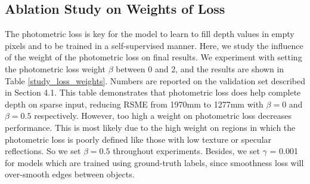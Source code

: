 \documentclass[letterpaper, 10 pt, conference]{ieeeconf}
\begin{document}
\subsection{Ablation Study on Weights of Loss}
    The photometric loss is key for the model to learn to fill depth values in empty pixels and to be trained in a self-supervised manner. Here, we study the influence of the weight of the photometric loss on final results. We experiment with setting the photometric loss weight $\beta$ between 0 and 2, and the results are shown in Table \ref{study_loss_weights}. Numbers are reported on the validation set described in Section 4.1. This table demonstrates that photometric loss does help complete depth on sparse input, reducing RSME from 1970mm to 1277mm with $\beta = 0$ and $\beta = 0.5$ respectively. However, too high a weight on photometric loss decreases performance. This is most likely due to the high weight on regions in which the photometric loss is poorly defined like those with low texture or specular reflections. So we set $\beta = 0.5$ throughout experiments. Besides, we set $\gamma$ = 0.001 for models which are trained using ground-truth labels, since smoothness loss will over-smooth edges between objects.
\end{document}
